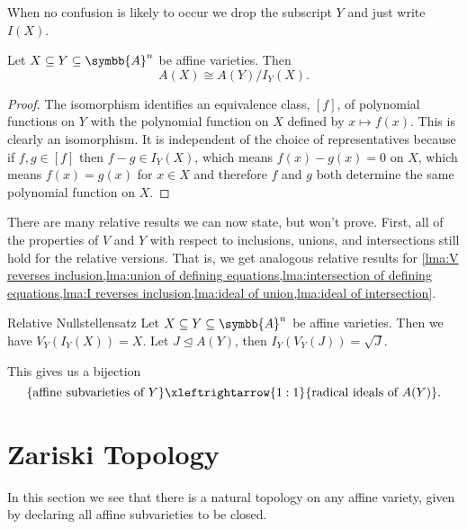 \documentclass[fleqn]{NotesClass}
\newcommand{\subideal}{\trianglelefteq}
\newcommand{\affine}{\symbb{A}}
\newcommand{\isomorphic}{\cong}
\begin{document}
    \begin{ntn}{}{}
        When no confusion is likely to occur we drop the subscript \(Y\) and just write \(I(X)\).
    \end{ntn}
    
    \begin{lma}{}{}
        Let \(X \subseteq Y \subseteq \affine^n\) be affine varieties.
        Then
        \begin{equation}
            A(X) \isomorphic A(Y) / I_Y(X).
        \end{equation}
        \begin{proof}
            The isomorphism identifies an equivalence class, \([f]\), of polynomial functions on \(Y\) with the polynomial function on \(X\) defined by \(x \mapsto f(x)\).
            This is clearly an isomorphism.
            It is independent of the choice of representatives because if \(f, g \in [f]\) then \(f - g \in I_Y(X)\), which means \(f(x) - g(x) = 0\) on \(X\), which means \(f(x) = g(x)\) for \(x \in X\) and therefore \(f\) and \(g\) both determine the same polynomial function on \(X\).
        \end{proof}
    \end{lma}
    
    There are many relative results we can now state, but won't prove.
    First, all of the properties of \(V\) and \(Y\) with respect to inclusions, unions, and intersections still hold for the relative versions.
    That is, we get analogous relative results for \cref{lma:V reverses inclusion,lma:union of defining equations,lma:intersection of defining equations,lma:I reverses inclusion,lma:ideal of union,lma:ideal of intersection}.
    
    \begin{thm}{Relative Nullstellensatz}{}
        Let \(X \subseteq Y \subseteq \affine^n\) be affine varieties.
        Then we have \(V_Y(I_Y(X)) = X\).
        Let \(J \subideal A(Y)\), then \(I_Y(V_Y(J)) = \sqrt{J}\).
    \end{thm}
    
    This gives us a bijection
    \begin{equation}
        \{\text{affine subvarieties of } Y\} \xleftrightarrow{1:1} \{\text{radical ideals of } A(Y)\}.
    \end{equation}
    
    \chapter{Zariski Topology}
    \label{chap:zariski topology}
    In this section we see that there is a natural topology on any affine variety, given by declaring all affine subvarieties to be closed.
    
\end{document}
